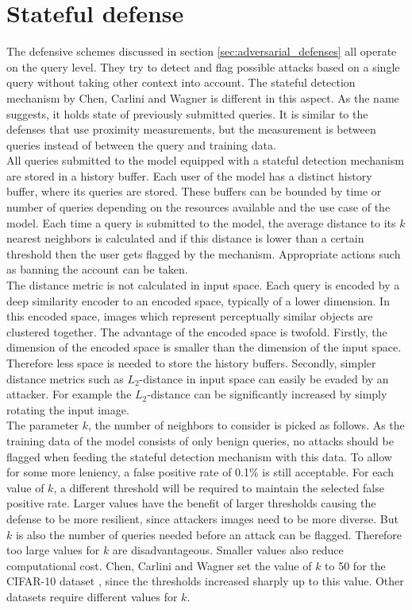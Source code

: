 \section{Stateful defense}\label{sec:stateful_detection}
The defensive schemes discussed in section \ref{sec:adversarial_defenses} all operate on the query level. They try to detect and flag possible attacks based on a single query without taking other context into account. The stateful detection mechanism by Chen, Carlini and Wagner \cite{chen_stateful_2019} is different in this aspect. As the name suggests, it holds state of previously submitted queries. It is similar to the defenses that use proximity measurements, but the measurement is between queries instead of between the query and training data.\\

All queries submitted to the model equipped with a stateful detection mechanism are stored in a history buffer. Each user of the model has a distinct history buffer, where its queries are stored. These buffers can be bounded by time or number of queries depending on the resources available and the use case of the model. Each time a query is submitted to the model, the average distance to its $k$ nearest neighbors is calculated and if this distance is lower than a certain threshold then the user gets flagged by the mechanism. Appropriate actions such as banning the account can be taken.\\

The distance metric is not calculated in input space. Each query is encoded by a deep similarity encoder \cite{deep_similarity_encoder} to an encoded space, typically of a lower dimension. In this encoded space, images which represent perceptually similar objects are clustered together. The advantage of the encoded space is twofold. Firstly, the dimension of the encoded space is smaller than the dimension of the input space. Therefore less space is needed to store the history buffers. Secondly, simpler distance metrics such as $L_2$-distance in input space can easily be evaded by an attacker. For example the $L_2$-distance can be significantly increased by simply rotating the input image.\\

The parameter $k$, the number of neighbors to consider is picked as follows. As the training data of the model consists of only benign queries, no attacks should be flagged when feeding the stateful detection mechanism with this data. To allow for some more leniency, a false positive rate of 0.1\% is still acceptable. For each value of $k$, a different threshold will be required to maintain the selected false positive rate. Larger values have the benefit of larger thresholds causing the defense to be more resilient, since attackers images need to be more diverse. But $k$ is also the number of queries needed before an attack can be flagged. Therefore too large values for $k$ are disadvantageous. Smaller values also reduce computational cost. Chen, Carlini and Wagner set the value of $k$ to 50 for the CIFAR-10  dataset \cite{cifar}, since the thresholds increased sharply up to this value. Other datasets require different values for $k$.

